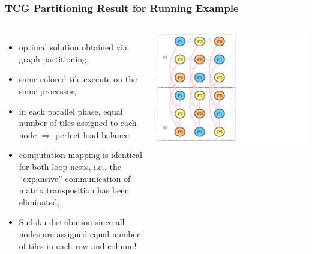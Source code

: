 \documentclass{beamer}
\newcommand{\emp}[1]{\textcolor{DikuRed}{ #1}}
\begin{document}
\begin{frame}[fragile,t]
  \frametitle{TCG Partitioning Result for Running Example}


\begin{columns}
\begin{itemize}
    \item optimal solution obtained via graph partitioning,
    \item same colored tile execute on the same processor,
    \item in each parallel phase, equal number of tiles
            assigned to each node $\Rightarrow$ perfect 
            load balance
    \item computation mapping is identical for both loop nests,
            i.e., the ``expansive'' communication of
            matrix transposition has been eliminated,
    \item \emp{Sudoku} distribution since all nodes are assigned
            equal number of tiles in each row and column! 
\end  {itemize}
\includegraphics[width=59ex]{Figures/TCGresultADI}
\end{columns}

\end{frame}
\end{document}
